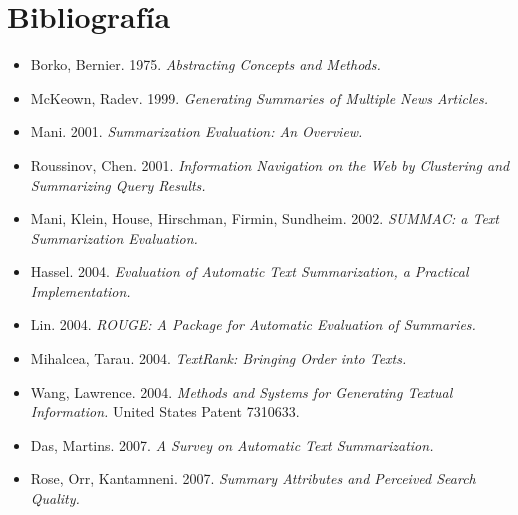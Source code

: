 \documentclass[12pt,a4paper]{article}
\begin{document}
\newpage
\section{Bibliografía}
\begin{itemize}
	\item Borko, Bernier. 1975. \textit{Abstracting Concepts and Methods.}
    \item McKeown, Radev. 1999. \textit{Generating Summaries of Multiple News Articles.}
	\item Mani. 2001. \textit{Summarization Evaluation: An Overview.}
	\item Roussinov, Chen. 2001. \textit{Information Navigation on the Web by Clustering and Summarizing Query Results. }
	\item Mani, Klein, House, Hirschman, Firmin, Sundheim. 2002. \textit{SUMMAC: a Text Summarization Evaluation.}
	\item Hassel. 2004. \textit{Evaluation of Automatic Text Summarization, a Practical Implementation.}
	\item Lin. 2004. \textit{ROUGE: A Package for Automatic Evaluation of Summaries.}
	\item Mihalcea, Tarau. 2004. \textit{TextRank: Bringing Order into Texts.}
	\item Wang, Lawrence. 2004. \textit{Methods and Systems for Generating Textual Information.} United States Patent 7310633.
	\item Das, Martins. 2007. \textit{A Survey on Automatic Text Summarization.}
	\item Rose, Orr, Kantamneni. 2007. \textit{Summary Attributes and Perceived Search Quality.}
\end{itemize}
\end{document}
